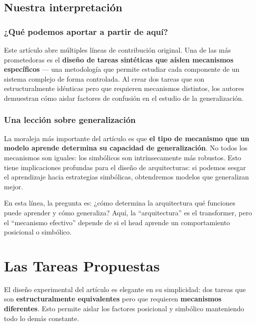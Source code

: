 \documentclass[12pt,a4paper,oneside]{report}
\begin{document}
\section{Nuestra interpretación}

\subsection{¿Qué podemos aportar a partir de aquí?}

Este artículo abre múltiples líneas de contribución original. Una de las más prometedoras es el \textbf{diseño de tareas sintéticas que aíslen mecanismos específicos} — una metodología que permite estudiar cada componente de un sistema complejo de forma controlada. Al crear dos tareas que son estructuralmente idénticas pero que requieren mecanismos distintos, los autores demuestran cómo aislar factores de confusión en el estudio de la generalización.

\subsection{Una lección sobre generalización}

La moraleja más importante del artículo es que \textbf{el tipo de mecanismo que un modelo aprende determina su capacidad de generalización}. No todos los mecanismos son iguales: los simbólicos son intrínsecamente más robustos. Esto tiene implicaciones profundas para el diseño de arquitecturas: si podemos sesgar el aprendizaje hacia estrategias simbólicas, obtendremos modelos que generalizan mejor.

En esta línea, la pregunta es: ¿cómo determina la arquitectura qué funciones puede aprender y cómo generaliza? Aquí, la ``arquitectura'' es el transformer, pero el ``mecanismo efectivo'' depende de si el head aprende un comportamiento posicional o simbólico.

\chapter{Las Tareas Propuestas}

El diseño experimental del artículo es elegante en su simplicidad: dos tareas que son \textbf{estructuralmente equivalentes} pero que requieren \textbf{mecanismos diferentes}. Esto permite aislar los factores posicional y simbólico manteniendo todo lo demás constante.
\end{document}
